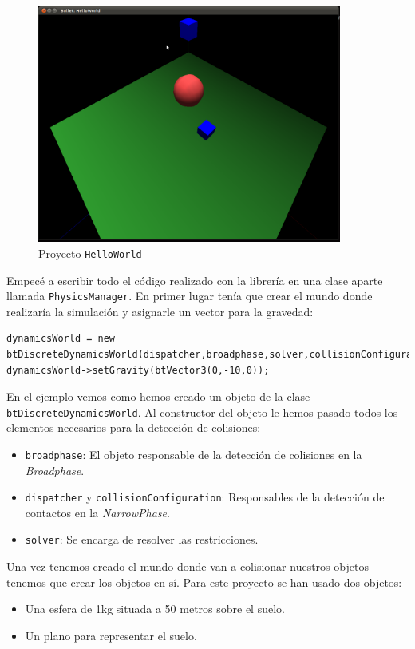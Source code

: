 \documentclass[12pt]{article}
\begin{document}
\begin{figure}[h]
\begin{center}
 \includegraphics[width=10cm]{figures/helloworld.png}
 \caption{Proyecto \texttt{HelloWorld}}
 \label{fig:helloworld}
\end{center}
\end{figure}

Empecé a escribir todo el código realizado con la librería en una clase aparte llamada \texttt{PhysicsManager}. En primer lugar tenía que crear el mundo donde realizaría la simulación y asignarle un vector para la gravedad:

{\scriptsize
\begin{verbatim}
dynamicsWorld = new btDiscreteDynamicsWorld(dispatcher,broadphase,solver,collisionConfiguration);
dynamicsWorld->setGravity(btVector3(0,-10,0));
\end{verbatim}
}

En el ejemplo vemos como hemos creado un objeto de la clase \texttt{btDiscreteDynamicsWorld}. Al constructor del objeto le hemos pasado todos los elementos necesarios para la detección de colisiones:
\begin{itemize}
  \item \texttt{broadphase}: El objeto responsable de la detección de colisiones en la \textit{Broadphase}.
  \item \texttt{dispatcher} y \texttt{collisionConfiguration}: Responsables de la detección de contactos en la \textit{NarrowPhase}.
  \item \texttt{solver}: Se encarga de resolver las restricciones.
\end{itemize}

Una vez tenemos creado el mundo donde van a colisionar nuestros objetos tenemos que crear los objetos en sí. Para este proyecto se han usado dos objetos:
\begin{itemize}
  \item Una esfera de 1kg situada a 50 metros sobre el suelo.
  \item Un plano para representar el suelo.
\end{itemize}
\end{document}
